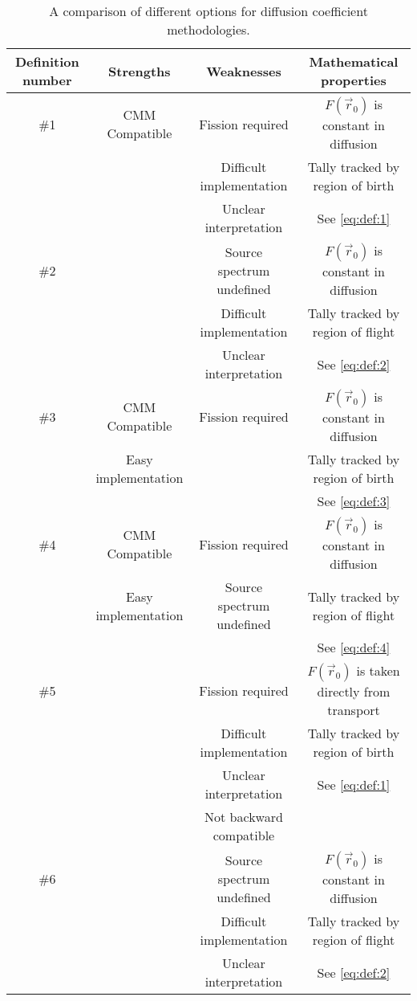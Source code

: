 \documentclass[a4paper,letterpaper,12pt,oneside,draft]{article}
\newcommand{\vr}{\ensuremath{\vec{r}}}
\begin{document}
\begin{table}[h!]
    \caption{A comparison of different options for diffusion coefficient methodologies.}\label{tbl:options}
    \begin{tabular}{|c|c|c|c|}
        \hline
        Definition number & Strengths & Weaknesses & Mathematical properties \\
        \hline
        \#1 & CMM Compatible & Fission required & $F(\vr_0)$ is constant in diffusion \\
        & & Difficult implementation & Tally tracked by region of birth \\
        & & Unclear interpretation & See \cref{eq:def:1} \\
        \hline
        \#2 & & Source spectrum undefined & $F(\vr_0)$ is constant in diffusion \\
        & & Difficult implementation & Tally tracked by region of flight \\
        & & Unclear interpretation & See \cref{eq:def:2} \\
        \hline
        \#3 & CMM Compatible & Fission required & $F(\vr_0)$ is constant in diffusion \\
        & Easy implementation & & Tally tracked by region of birth \\
        & & & See \cref{eq:def:3} \\
        \hline
        \#4 & CMM Compatible & Fission required & $F(\vr_0)$ is constant in diffusion \\
        & Easy implementation & Source spectrum undefined & Tally tracked by region of flight \\
        & &  & See \cref{eq:def:4} \\
        \hline
        \#5 & & Fission required & $F(\vr_0)$ is taken directly from transport \\
        & & Difficult implementation & Tally tracked by region of birth \\
        & & Unclear interpretation & See \cref{eq:def:1} \\
        & & Not backward compatible & \\
        \hline
        \#6 & & Source spectrum undefined & $F(\vr_0)$ is constant in diffusion \\
        & & Difficult implementation & Tally tracked by region of flight \\
        & & Unclear interpretation & See \cref{eq:def:2} \\
        \hline
    \end{tabular}
\end{table}
\end{document}
